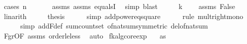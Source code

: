 \begin{isabellebody}
\ {\isacharparenleft}{\kern0pt}cases\ {\isachardoublequoteopen}n{\isacharequal}{\kern0pt}{}{\isachardoublequoteclose}{\isacharparenright}{\kern0pt}\ \isanewline
\ \ \ \ \isamarkupfalse%
\ assms{\isacharparenleft}{\kern0pt}{}{\isacharparenright}{\kern0pt}\ assms{\isacharparenleft}{\kern0pt}{}{\isacharparenright}{\kern0pt}\ equals{}I\ \isamarkupfalse%
\ {\isacharparenleft}{\kern0pt}simp{\isacharcomma}{\kern0pt}\ blast{\isacharparenright}{\kern0pt}\isanewline
\ \ \isamarkupfalse%
\ \isamarkupfalse%
\ {\isachardoublequoteopen}k\ {\isacharequal}{\kern0pt}\ {}{\isachardoublequoteclose}\ \isamarkupfalse%
\ assms\ False\ \isamarkupfalse%
\ linarith\isanewline
\ \ \isamarkupfalse%
\ \isamarkupfalse%
\ {\isacharquery}{\kern0pt}thesis\isanewline
\ \ \ \ \isamarkupfalse%
\ {\isacharparenleft}{\kern0pt}simp\ add{\isacharcolon}{\kern0pt}power{}{\isacharunderscore}{\kern0pt}eq{\isacharunderscore}{\kern0pt}square{\isacharparenright}{\kern0pt}\isanewline
\ \ \ \ \isamarkupfalse%
\ {\isacharparenleft}{\kern0pt}rule\ mult{\isacharunderscore}{\kern0pt}right{\isacharunderscore}{\kern0pt}mono{\isacharparenright}{\kern0pt}\isanewline
\ \ \ \ \isamarkupfalse%
\ {\isacharparenleft}{\kern0pt}simp\ add{\isacharcolon}{\kern0pt}F{\isacharunderscore}{\kern0pt}def\ sum{\isacharunderscore}{\kern0pt}count{\isacharunderscore}{\kern0pt}set\ of{\isacharunderscore}{\kern0pt}nat{\isacharunderscore}{\kern0pt}sum{\isacharbrackleft}{\kern0pt}symmetric{\isacharbrackright}{\kern0pt}\ del{\isacharcolon}{\kern0pt}of{\isacharunderscore}{\kern0pt}nat{\isacharunderscore}{\kern0pt}sum{\isacharparenright}{\kern0pt}\isanewline
\ \ \ \ \isamarkupfalse%
\ F{\isacharunderscore}{\kern0pt}gr{\isacharunderscore}{\kern0pt}{}{\isacharbrackleft}{\kern0pt}OF\ assms{\isacharparenleft}{\kern0pt}{}{\isacharparenright}{\kern0pt}{\isacharbrackright}{\kern0pt}\ order{\isacharunderscore}{\kern0pt}le{\isacharunderscore}{\kern0pt}less\ \isamarkupfalse%
\ auto\isanewline
{}\isamarkupfalse%
%
\endisatagproof
{\isafoldproof}%
%
\isadelimproof
\isanewline
%
\endisadelimproof
\isanewline
{}\isamarkupfalse%
\ fk{\isacharunderscore}{\kern0pt}alg{\isacharunderscore}{\kern0pt}core{\isacharunderscore}{\kern0pt}exp{\isacharcolon}{\kern0pt}\isanewline
\ \ \ {\isachardoublequoteopen}as\ {\isasymnoteq}\ {\isacharbrackleft}{\kern0pt}{\isacharbrackright}{\kern0pt}{\isachardoublequoteclose}\isanewline

\end{isabellebody}
